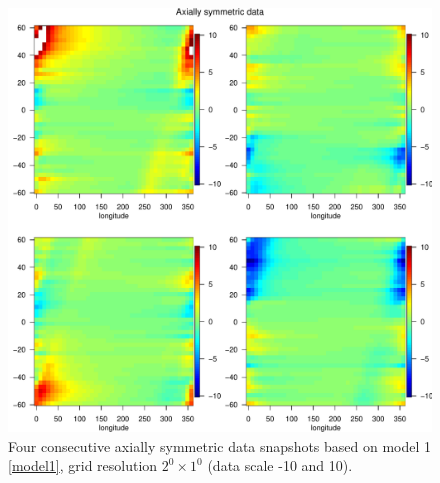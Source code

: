 % 
% 

\begin{figure}[H]
\label{grid_plot_model1}
\begin{center}
\includegraphics [scale=.8]{graphs/Data_sample_120_model1.pdf}
\caption*{Four consecutive axially symmetric data snapshots based on model 1 \eqref{model1}, grid resolution $2^0\times 1^0$ (data scale -10 and 10).}
\end{center}
\end{figure}

